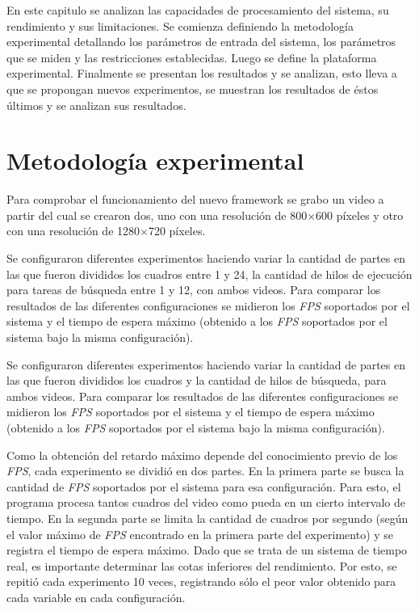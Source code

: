 
En este capitulo se analizan las capacidades de procesamiento del sistema, su
rendimiento y sus limitaciones. Se comienza definiendo la metodología
experimental detallando los parámetros de entrada del sistema, los parámetros
que se miden y las restricciones establecidas. Luego se define la plataforma
experimental. Finalmente se presentan los resultados y se analizan, esto lleva a
que se propongan nuevos experimentos, se muestran los resultados de éstos
últimos y se analizan sus resultados.

\section{Metodología experimental}

\label{metodologiaExperimental}

Para comprobar el funcionamiento del nuevo framework se grabo un video a partir
del cual se crearon dos, uno con una resolución de 800$\times$600 píxeles y otro
con una resolución de 1280$\times$720 píxeles.

Se configuraron diferentes experimentos haciendo variar la cantidad de partes en
las que fueron divididos los cuadros entre 1 y 24, la cantidad de hilos de
ejecución para tareas de búsqueda entre 1 y 12, con ambos videos. Para comparar
los resultados de las diferentes configuraciones se midieron los \emph{FPS}
soportados por el sistema y el tiempo de espera máximo (obtenido a los
\emph{FPS} soportados por el sistema bajo la misma configuración).

Se configuraron diferentes experimentos haciendo variar la cantidad de partes en
las que fueron divididos los cuadros y la cantidad de hilos de búsqueda, para
ambos videos. Para comparar los resultados de las diferentes configuraciones se
midieron los \emph{FPS} soportados por el sistema y el tiempo de espera máximo
(obtenido a los \emph{FPS} soportados por el sistema bajo la misma
configuración).

Como la obtención del retardo máximo depende del conocimiento previo de los
\emph{FPS}, cada experimento se dividió en dos partes. En la primera parte se
busca la cantidad de \emph{FPS} soportados por el sistema para esa
configuración. Para esto, el programa procesa tantos cuadros del video como
pueda en un cierto intervalo de tiempo. En la segunda parte se limita la
cantidad de cuadros por segundo (según el valor máximo de \emph{FPS} encontrado
en la primera parte del experimento) y se registra el tiempo de espera máximo.
Dado que se trata de un sistema de tiempo real, es importante determinar las
cotas inferiores del rendimiento. Por esto, se repitió cada experimento 10
veces, registrando sólo el peor valor obtenido para cada variable en cada
configuración.

